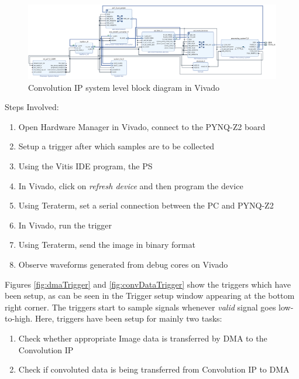     \begin{figure}[H]
        \centering
        \includegraphics[width=\linewidth]{images/BlockDesign.png}
        \caption{Convolution IP system level block diagram in Vivado}
        \label{fig:block-design}
    \end{figure}
    
    \noindent Steps Involved:
    \begin{enumerate}[noitemsep, topsep=3pt]
        \item Open Hardware Manager in Vivado, connect to the PYNQ-Z2 board
        \item Setup a trigger after which samples are to be collected
        \item Using the Vitis IDE program, the PS 
        \item In Vivado, click on \textit{refresh device} and then program the device
        \item Using Teraterm, set a serial connection between the PC and PYNQ-Z2 
        \item In Vivado, run the trigger 
        \item Using Teraterm, send the image in binary format
        \item Observe waveforms generated from debug cores on Vivado
    \end{enumerate}

    \noindent
    Figures \ref{fig:dmaTrigger} and \ref{fig:convDataTrigger} show the triggers which have been setup, as can be seen in the Trigger setup window appearing at the bottom right corner. The triggers start to sample signals whenever \textit{valid} signal goes low-to-high. Here, triggers have been setup for mainly two tasks:

    \begin{enumerate}[noitemsep, topsep=3pt]
        \item Check whether appropriate Image data is transferred by DMA to the Convolution IP
        \item Check if convoluted data is being transferred from Convolution IP to DMA
    \end{enumerate}

